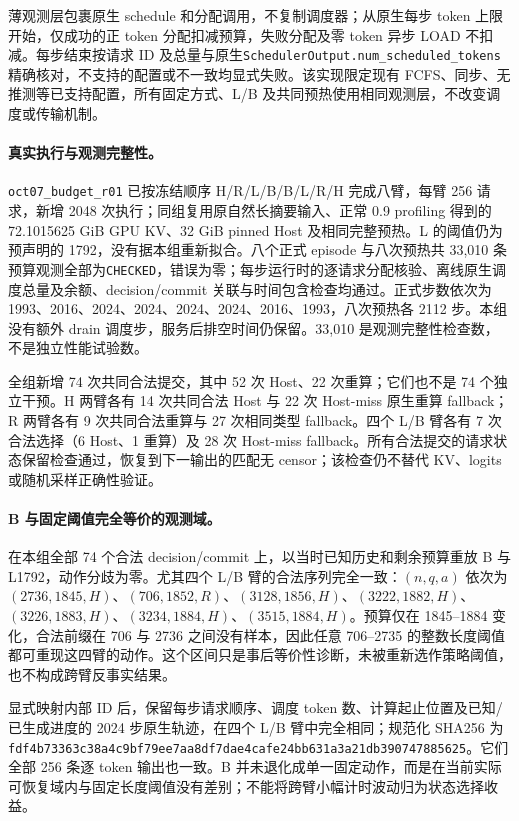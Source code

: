 \documentclass[UTF8,fontset=fandol,a4paper,10pt]{ctexart}
\newcommand{\code}[1]{\nolinkurl{#1}}
\begin{document}
薄观测层包裹原生 schedule 和分配调用，不复制调度器；从原生每步 token 上限开始，仅成功的正 token 分配扣减预算，失败分配及零 token 异步 LOAD 不扣减。每步结束按请求 ID 及总量与原生\code{SchedulerOutput.num_scheduled_tokens} 精确核对，不支持的配置或不一致均显式失败。该实现限定现有 FCFS、同步、无推测等已支持配置，所有固定方式、L/B 及共同预热使用相同观测层，不改变调度或传输机制。

\paragraph{真实执行与观测完整性。}
\code{oct07_budget_r01} 已按冻结顺序 H/R/L/B/B/L/R/H 完成八臂，每臂 256 请求，新增 2048 次执行；同组复用原自然长摘要输入、正常 0.9 profiling 得到的 72.1015625 GiB GPU KV、32 GiB pinned Host 及相同完整预热。L 的阈值仍为预声明的 1792，没有据本组重新拟合。八个正式 episode 与八次预热共 33,010 条预算观测全部为\code{CHECKED}，错误为零；每步运行时的逐请求分配核验、离线原生调度总量及余额、decision/commit 关联与时间包含检查均通过。正式步数依次为 1993、2016、2024、2024、2024、2024、2016、1993，八次预热各 2112 步。本组没有额外 drain 调度步，服务后排空时间仍保留。33,010 是观测完整性检查数，不是独立性能试验数。

全组新增 74 次共同合法提交，其中 52 次 Host、22 次重算；它们也不是 74 个独立干预。H 两臂各有 14 次共同合法 Host 与 22 次 Host-miss 原生重算 fallback；R 两臂各有 9 次共同合法重算与 27 次相同类型 fallback。四个 L/B 臂各有 7 次合法选择（6 Host、1 重算）及 28 次 Host-miss fallback。所有合法提交的请求状态保留检查通过，恢复到下一输出的匹配无 censor；该检查仍不替代 KV、logits 或随机采样正确性验证。

\paragraph{B 与固定阈值完全等价的观测域。}
在本组全部 74 个合法 decision/commit 上，以当时已知历史和剩余预算重放 B 与 L1792，动作分歧为零。尤其四个 L/B 臂的合法序列完全一致：$(n,q,a)$ 依次为 $(2736,1845,H)$、$(706,1852,R)$、$(3128,1856,H)$、$(3222,1882,H)$、$(3226,1883,H)$、$(3234,1884,H)$、$(3515,1884,H)$。预算仅在 1845--1884 变化，合法前缀在 706 与 2736 之间没有样本，因此任意 706--2735 的整数长度阈值都可重现这四臂的动作。这个区间只是事后等价性诊断，未被重新选作策略阈值，也不构成跨臂反事实结果。

显式映射内部 ID 后，保留每步请求顺序、调度 token 数、计算起止位置及已知/已生成进度的 2024 步原生轨迹，在四个 L/B 臂中完全相同；规范化 SHA256 为\code{fdf4b73363c38a4c9bf79ee7aa8df7dae4cafe24bb631a3a21db390747885625}。它们全部 256 条逐 token 输出也一致。B 并未退化成单一固定动作，而是在当前实际可恢复域内与固定长度阈值没有差别；不能将跨臂小幅计时波动归为状态选择收益。
\end{document}
